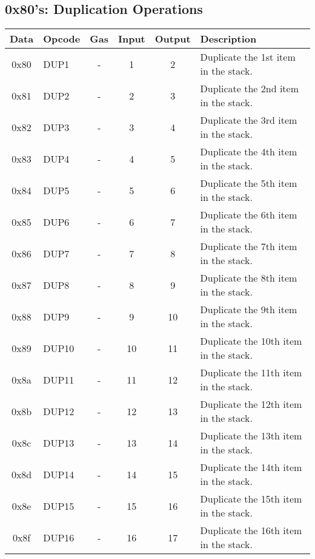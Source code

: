 \documentclass[10pt,letterpaper,leqno,bibliography=totoc]{scrartcl}
\newenvironment{alphafootnotes}
{\par\edef\savedfootnotenumber{\number\value{footnote}}
\renewcommand{\thefootnote}{\alph{footnote}}
\setcounter{footnote}{0}}
{\par\setcounter{footnote}{\savedfootnotenumber}}
\begin{document}
\begin{alphafootnotes}
		\subsection{0x80's: Duplication Operations}
			\begin{longtable}{|cP{2.8cm}cccp{6cm}|}
		        \hline
		        \textbf{Data} & \textbf{Opcode} & \textbf{Gas}  & \textbf{Input}  & \textbf{Output} & \textbf{Description} \\
		        \hline
			0x80 & DUP1 & - & 1 & 2 & Duplicate the 1st item in the stack. \\
			0x81 & DUP2 & - & 2 & 3 & Duplicate the 2nd item in the stack. \\
			0x82 & DUP3 & - & 3 & 4 & Duplicate the 3rd item in the stack. \\
			0x83 & DUP4 & - & 4 & 5 & Duplicate the 4th item in the stack. \\
			0x84 & DUP5 & - & 5 & 6 & Duplicate the 5th item in the stack. \\
			0x85 & DUP6 & - & 6 & 7 & Duplicate the 6th item in the stack. \\
			0x86 & DUP7 & - & 7 & 8 & Duplicate the 7th item in the stack. \\
			0x87 & DUP8 & - & 8 & 9 & Duplicate the 8th item in the stack. \\
			0x88 & DUP9 & - & 9 & 10 & Duplicate the 9th item in the stack. \\
			0x89 & DUP10 & - & 10 & 11 & Duplicate the 10th item in the stack. \\
			0x8a & DUP11 & - & 11 & 12 & Duplicate the 11th item in the stack. \\
			0x8b & DUP12 & - & 12 & 13 & Duplicate the 12th item in the stack. \\
			0x8c & DUP13 & - & 13 & 14 & Duplicate the 13th item in the stack. \\
			0x8d & DUP14 & - & 14 & 15 & Duplicate the 14th item in the stack. \\
			0x8e & DUP15 & - & 15 & 16 & Duplicate the 15th item in the stack. \\
			0x8f & DUP16 & - & 16 & 17 & Duplicate the 16th item in the stack. \\		
			\hline
			\end{longtable}
        
	

\end{alphafootnotes}
\end{document}
